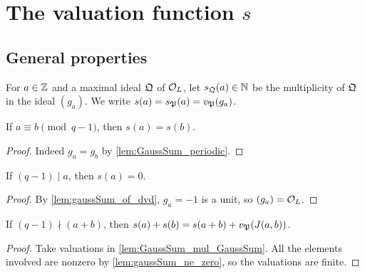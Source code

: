 \chapter{The valuation function $s$}

\section{General properties}

\begin{definition}
  \label{def:s}
  \leanok
  For $a \in \mathbb{Z}$ and a maximal ideal $\mathfrak{Q}$ of $\mathcal{O}_L$, let $s_{\mathfrak{Q}}(a) \in \mathbb{N}$ be the
  multiplicity of $\mathfrak{Q}$ in the ideal $(g_a)$. We write $s(a) = s_{\mathfrak{P}}(a) = v_{\mathfrak{P}}(g_a)$.
\end{definition}

\begin{lemma}
  \label{lem:valGauss_periodic}
  \leanok
  If $a \equiv b \pmod{q-1}$, then $s(a) = s(b)$.
\end{lemma}

\begin{proof}
  \leanok
  Indeed $g_a = g_b$ by \ref{lem:GaussSum_periodic}.
\end{proof}

\begin{lemma}
  \label{lem:valGauss_eq_zero}
  \leanok
  If $(q - 1) \mid a$, then $s(a) = 0$.
\end{lemma}

\begin{proof}
  \leanok
  By \ref{lem:gaussSum_of_dvd}, $g_a = -1$ is a unit, so $(g_a) = \mathcal{O}_L$.
\end{proof}

\begin{lemma}
  \label{lem:valGauss_add_valGauss}
  \leanok
  If $(q-1) \nmid (a+b)$, then $s(a) + s(b) = s(a+b) + v_{\mathfrak{P}}(J(a, b))$.
\end{lemma}

\begin{proof}
  \leanok
  Take valuations in \ref{lem:GaussSum_mul_GaussSum}. All the elements involved are nonzero by
  \ref{lem:gaussSum_ne_zero}, so the valuations are finite.
\end{proof}

